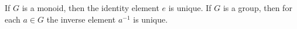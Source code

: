 \begin{theorem}
If $G$ is a monoid, then the identity element $e$ is unique. If $G$ is a group, then for each $a \in G$ the inverse element $a^{-1}$ is unique.
\end{theorem}

